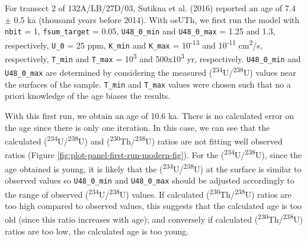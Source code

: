 \documentclass[]{elsarticle} %
\begin{document}
For transect 2 of 132A/LB/27D/03, Sutikna et al. (2016) reported an age of 7.4 \(\pm\) 0.5 ka (thousand years before 2014). With osUTh, we first run the model with \texttt{nbit} = 1, \texttt{fsum\_target} = 0.05, \texttt{U48\_0\_min} and \texttt{U48\_0\_max} = 1.25 and 1.3, respectively, \texttt{U\_0} = 25 ppm, \texttt{K\_min} and \texttt{K\_max} = 10\textsuperscript{-13} and 10\textsuperscript{-11} cm\textsuperscript{2}/s, respectively, \texttt{T\_min} and \texttt{T\_max} = 10\textsuperscript{3} and 500x10\textsuperscript{3} yr, respectively. \texttt{U48\_0\_min} and \texttt{U48\_0\_max} are determined by considering the measured (\textsuperscript{234}U/\textsuperscript{238}U) values near the surfaces of the sample. \texttt{T\_min} and \texttt{T\_max} values were chosen such that no a priori knowledge of the age biases the results.

With this first run, we obtain an age of 10.6 ka. There is no calculated error on the age since there is only one iteration. In this case, we can see that the calculated (\textsuperscript{234}U/\textsuperscript{238}U) and (\textsuperscript{230}Th/\textsuperscript{238}U) ratios are not fitting well observed ratios (Figure \ref{fig:plot-panel-first-run-modern-fig}). For the (\textsuperscript{234}U/\textsuperscript{238}U), since the age obtained is young, it is likely that the (\textsuperscript{234}U/\textsuperscript{238}U) at the surface is similar to observed values so \texttt{U48\_0\_min} and \texttt{U48\_0\_max} should be adjusted accordingly to the range of observed (\textsuperscript{234}U/\textsuperscript{238}U) values. If calculated (\textsuperscript{230}Th/\textsuperscript{238}U) ratios are too high compared to observed values, this suggests that the calculated age is too old (since this ratio increases with age); and conversely if calculated (\textsuperscript{230}Th/\textsuperscript{238}U) ratios are too low, the calculated age is too young.
\end{document}
